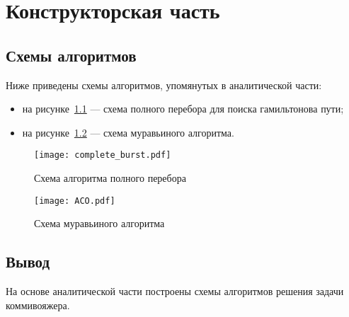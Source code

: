 \chapter{Конструкторская часть}
\section{Схемы алгоритмов}

Ниже приведены схемы алгоритмов, упомянутых в аналитической части:
\begin{itemize}
	\item на рисунке~\ref{fig:complete_scheme} --- схема полного перебора для поиска гамильтонова пути;
	\item на рисунке~\ref{fig:aco_scheme} --- схема муравьиного алгоритма.
\end{itemize}
\begin{figure}[H]
	\centering
	\texttt{[image: complete\_burst.pdf]}
	\caption{Схема алгоритма полного перебора}
	\label{fig:complete_scheme}
\end{figure}
\begin{figure}[H]
	\centering
	\texttt{[image: ACO.pdf]}
	\caption{Схема муравьиного алгоритма}
	\label{fig:aco_scheme}
\end{figure}
\section*{Вывод}

На основе аналитической части построены схемы алгоритмов решения задачи коммивояжера.

\clearpage